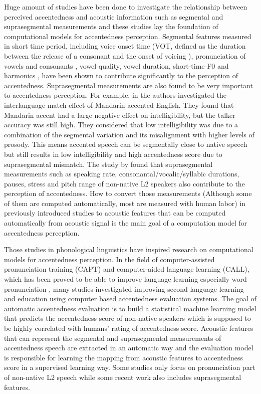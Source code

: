 Huge amount of studies have been done to investigate the relationship between perceived accentedness and acoustic information such as segmental and suprasegmental measurements and these studies lay the foundation of computational models for accentedness perception. Segmental features measured in short time period, including voice onset time (VOT, defined as the duration between the release of a consonant and the onset of voicing )\citep{lisker1964cross,mccullough2013perceived,mccullough2013perceived}, pronunciation of vowels and consonants \citep{flege1995second,deterding2006pronunciation,sangwan2012automatic}, vowel quality, vowel duration, short-time F0 and harmonics  \citep{mccullough2013acoustic, mccullough2013perceived}, have been shown to contribute significantly to the perception of accentedness. Suprasegmental measurements are also found to be very important to accentedness perception. For example, in  \citep{hardman2014accentedness} the authors investigated the interlanguage match effect of Mandarin-accented English. They found that Mandarin accent had a large negative effect on intelligibility, but the talker accuracy was still high. They considered that low intelligibility was due to a combination of the segmental variation and its misalignment with higher levels of prosody. This means accented speech can be segmentally close to native speech but still results in low intelligibility and high accentedness score due to suprasegmental mismatch. The study by \cite{munro2001modeling, mok2008comparing, kang2010relative} found that suprasegmental measurements such as speaking rate, consonantal/vocalic/syllabic durations, pauses, stress and pitch range of non-native L2 speakers also contribute to the perception of accentedness. How to convert those measurements (Although some of them are computed automatically, most are measured with human labor) in previously introduced studies to acoustic features that can be computed automatically from acoustic signal is the main goal of a computation model for accentedness perception.

Those studies in phonological linguistics have inspired research on computational models for accentedness perception. In the field of computer-assisted pronunciation training (CAPT) and computer-aided language learning (CALL), which has been proved to be able to improve language learning especially word pronunciation \citep{neri2008effectiveness}, many studies investigated improving second language learning and education using computer based accentedness evaluation systems. The goal of automatic accentedness evaluation is to build a statistical machine learning model that predicts the accentedness score of non-native speakers which is supposed to be highly correlated with humans' rating of accentedness score. Acoustic features that can represent the segmental and suprasegmental measurements of accentedness speech are extracted in an automatic way and the evaluation model is responsible for learning the mapping from acoustic features to accentedness score in a supervised learning way. Some studies only focus on pronunciation part of non-native L2 speech while some recent work also includes suprasegmental features.

